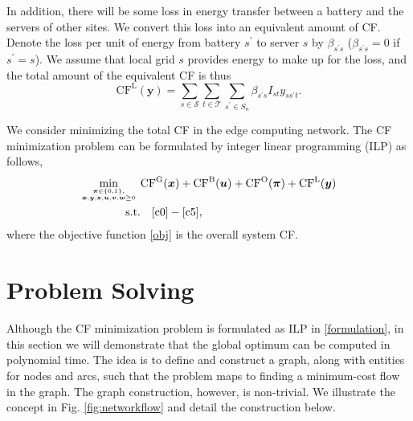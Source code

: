 \documentclass[conference, 10pt, ﬁnal, letterpaper, twocolumn]{IEEEtran}
\begin{document}
In addition, there will be some loss in energy transfer between a battery and the servers of other sites. We convert this loss into an equivalent amount of CF. Denote the loss per unit of energy from battery $s^\prime$ to server $s$ by $\beta_{s^\prime s}$ ($\beta_{s^\prime s} = 0$ if $s^\prime = s$). We assume that local grid $s$ provides energy to make up for the loss, and the total amount of the equivalent CF is thus 
\begin{equation}\label{lo}
    \text{CF}^{\text{L}}(\boldsymbol{y}) = \sum_{s \in \mathcal{S}}  \sum_{t \in \mathcal{T}}\sum_{s^\prime \in S_n}  \beta_{s^\prime s} I_{st} y _{ss^\prime t}.
\end{equation}

We consider minimizing the total CF in the edge computing network. The CF minimization problem can be formulated by integer linear programming (ILP) as follows,
\begin{subequations}\label{formulation}
    \begin{align}
         \mathop{\min}_{\boldsymbol{\pi} \in \{0,1\}, \atop \boldsymbol{x}, \boldsymbol{y}, \boldsymbol{z}, \boldsymbol{u}, \boldsymbol{v}, \boldsymbol{w} \geq 0} \ & \text{CF}^{\text{G}}(\boldsymbol{x}) +  \text{CF}^{\text{B}}(\boldsymbol{u}) + \text{CF}^{\text{O}}(\boldsymbol{\pi}) + \text{CF}^{\text{L}}(\boldsymbol{y}) \label{obj}\\
         \text{s.t.} & \quad \eqref{c0} - \eqref{c5},\notag
    \end{align}
\end{subequations}
where the objective function \eqref{obj} is the overall system CF.

\section{Problem Solving} 

% 
% 


Although the CF minimization problem is formulated as ILP in \eqref{formulation}, in this section we will demonstrate that the global optimum can be computed in polynomial time. The idea is to define and construct a graph, along with entities for nodes and arcs, such that the problem maps to finding a minimum-cost flow in the graph. The graph construction, however, is non-trivial. We illustrate the concept in Fig. \ref{fig:networkflow} and detail the construction below.
\end{document}
